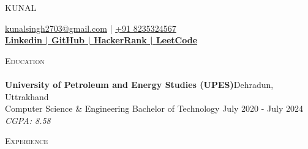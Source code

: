 \documentclass[a4paper]{article}
\newcommand{\lineunder} {
    \vspace*{-8pt} \\
    \hspace*{-18pt} \hrulefill \\
}
\newcommand{\header} [1] {
    {\hspace*{-18pt}\vspace*{6pt} \textsc{#1}}
    \vspace*{-6pt} \lineunder
}
\begin{document}
    \vspace*{-40pt}

    

%
%
  \vspace*{-2pt}
  \begin{center}
    {\Huge \scshape {KUNAL}}\\
    \vspace*{2pt}
    
    \vspace*{2pt}
    \href{mailto:kunalsingh2703@gmail.com}{kunalsingh2703@gmail.com} | \href{tel:+91 8235324567}{+91 8235324567}\\
    \vspace*{2pt}
    \textbf{\href{https://www.linkedin.com/in/kunal27/}{Linkedin | }}\textbf{\href{https://github.com/Kunal2703}{GitHub | }}\textbf{\href{https://www.hackerrank.com/kunal\_27?hr\_r=1}{HackerRank | }}\textbf{\href{https://leetcode.com/kunal\_2703/}{LeetCode}}\\
  \end{center}



      \header{Education}
      \vspace{1mm}
      \textbf{University of Petroleum and Energy Studies (UPES)}\hfill Dehradun, Uttrakhand\\
Computer Science \& Engineering Bachelor of Technology \hfill July 2020 - July 2024\\
{\sl CGPA: 8.58}\\
\vspace{2mm}

      \header{Experience}
      \vspace{1mm}
\end{document}
